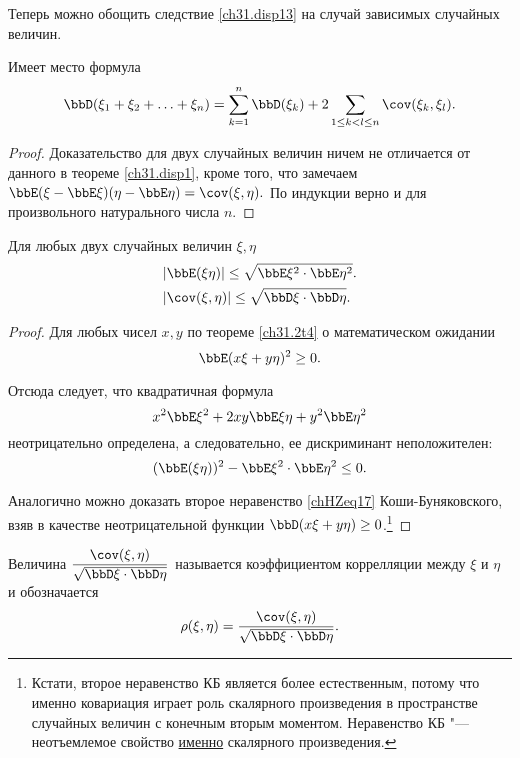 Теперь можно обощить следствие \ref{ch31.disp13} на случай зависимых случайных величин.
\begin{thm}
Имеет место формула
$$
\bbD(\xi_1 + \xi_2 + \ldots + \xi_n) = \sum\limits_{k=1}^{n} \bbD(\xi_k) + 2 \sum\limits_{1\le k < l \le n} \cov (\xi_k,\xi_l).
$$
\end{thm}
\begin{proof}
Доказательство для двух случайных величин ничем не отличается от данного в теореме \ref{ch31.disp1}, кроме того, что замечаем  $\bbE(\xi - \bbE\xi)(\eta - \bbE\eta)=\cov (\xi,\eta).$ По индукции верно и для произвольного натурального числа $n$.
\end{proof}
\begin{thm}
Для любых двух случайных величин $\xi, \eta$
\begin{align}
&|\bbE(\xi\eta)| \le \sqrt{\bbE\xi^2 \cdot \bbE\eta^2}.\\
&|\cov(\xi,\eta)| \le \sqrt{\bbD\xi\cdot \bbD\eta}.\label{chHZeq17}
\end{align}
\end{thm}
\begin{proof}
Для любых чисел $x, y$ по теореме \ref{ch31.2t4} о математическом ожидании 
$$
\bbE(x\xi + y\eta)^2 \ge 0.
$$

Отсюда следует, что квадратичная формула
$$
x^2\bbE\xi^2 + 2xy\bbE\xi\eta + y^2\bbE\eta^2
$$
неотрицательно определена, а следовательно, ее дискриминант неположителен:
$$
(\bbE(\xi\eta))^2 - \bbE\xi^2 \cdot \bbE\eta^2 \le 0.
$$

Аналогично можно доказать второе неравенство \eqref{chHZeq17} Коши-Буняковского, взяв в качестве неотрицательной функции $\bbD(x\xi + y\eta)\ge 0$.\footnote{Кстати, второе неравенство КБ является более естественным, потому что именно ковариация играет роль скалярного произведения в пространстве случайных величин с конечным вторым моментом. Неравенство КБ "--- неотъемлемое свойство \underline{именно} скалярного произведения.}
\end{proof}

\begin{defn}
Величина $\displaystyle\frac{\cov(\xi,\eta)}{\sqrt{\bbD\xi\cdot \bbD\eta}}$ называется коэффициентом коррелляции между $\xi$ и $\eta$  и обозначается $$\rho (\xi,\eta) = \frac{\cov(\xi,\eta)}{\sqrt{\bbD\xi\cdot \bbD\eta}}.$$
\end{defn}

